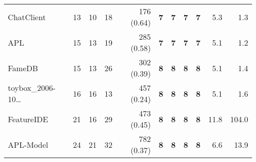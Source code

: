 \begin{table*}
\begin{tiny}
{{\begin{tabular}{lrrrrrrrrrr}
ChatClient & \num[text-series-to-math=true]{13} & \num[text-series-to-math=true]{10} & \num[text-series-to-math=true]{18} & \num[text-series-to-math=true]{176} (\num[text-series-to-math=true]{0.64}) & \textbf{\num[text-series-to-math=true]{7}} & \textbf{\num[text-series-to-math=true]{7}} & \textbf{\num[text-series-to-math=true]{7}} & \textbf{\num[text-series-to-math=true]{7}} & 5.3 & 1.3\\
APL & \num[text-series-to-math=true]{15} & \num[text-series-to-math=true]{13} & \num[text-series-to-math=true]{19} & \num[text-series-to-math=true]{285} (\num[text-series-to-math=true]{0.58}) & \textbf{\num[text-series-to-math=true]{7}} & \textbf{\num[text-series-to-math=true]{7}} & \textbf{\num[text-series-to-math=true]{7}} & \textbf{\num[text-series-to-math=true]{7}} & 5.1 & 1.2\\
FameDB & \num[text-series-to-math=true]{15} & \num[text-series-to-math=true]{13} & \num[text-series-to-math=true]{26} & \num[text-series-to-math=true]{302} (\num[text-series-to-math=true]{0.39}) & \textbf{\num[text-series-to-math=true]{8}} & \textbf{\num[text-series-to-math=true]{8}} & \textbf{\num[text-series-to-math=true]{8}} & \textbf{\num[text-series-to-math=true]{8}} & 5.1 & 1.4\\
toybox\_2006-10\ldots & \num[text-series-to-math=true]{16} & \num[text-series-to-math=true]{16} & \num[text-series-to-math=true]{13} & \num[text-series-to-math=true]{457} (\num[text-series-to-math=true]{0.24}) & \textbf{\num[text-series-to-math=true]{8}} & \textbf{\num[text-series-to-math=true]{8}} & \textbf{\num[text-series-to-math=true]{8}} & \textbf{\num[text-series-to-math=true]{8}} & 5.1 & 1.6\\
FeatureIDE & \num[text-series-to-math=true]{21} & \num[text-series-to-math=true]{16} & \num[text-series-to-math=true]{29} & \num[text-series-to-math=true]{473} (\num[text-series-to-math=true]{0.45}) & \textbf{\num[text-series-to-math=true]{8}} & \textbf{\num[text-series-to-math=true]{8}} & \textbf{\num[text-series-to-math=true]{8}} & \textbf{\num[text-series-to-math=true]{8}} & 11.8 & 104.0\\
APL-Model & \num[text-series-to-math=true]{24} & \num[text-series-to-math=true]{21} & \num[text-series-to-math=true]{32} & \num[text-series-to-math=true]{782} (\num[text-series-to-math=true]{0.37}) & \textbf{\num[text-series-to-math=true]{8}} & \textbf{\num[text-series-to-math=true]{8}} & \textbf{\num[text-series-to-math=true]{8}} & \textbf{\num[text-series-to-math=true]{8}} & 6.6 & 13.9\\

\end{tabular}}}
\end{tiny}
\end{table*}
